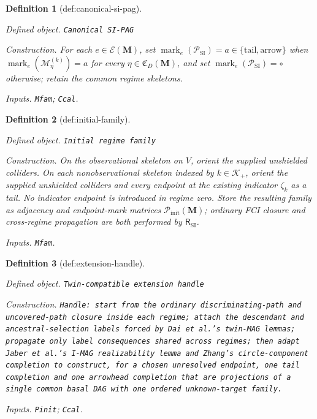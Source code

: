 \documentclass{article}
\newtheorem{definition}{Definition}
\begin{document}
\begin{definition}[def:canonical-si-pag]\label{def:canonical-si-pag}
\par\smallskip\noindent\emph{Defined object.} \texttt{Canonical SI-\allowbreak{}PAG}
\par\smallskip\noindent\emph{Construction.} For each \(e\in\mathcal E(\mathbf M)\), set \(\operatorname{mark}_e(\mathcal P_{\mathrm{SI}})=a\in\{\mathrm{tail},\mathrm{arrow}\}\) when \(\operatorname{mark}_e(\mathcal M_\eta^{(k)})=a\) for every \(\eta\in\mathfrak C_D(\mathbf M)\), and set \(\operatorname{mark}_e(\mathcal P_{\mathrm{SI}})=\circ\) otherwise; retain the common regime skeletons.
\par\smallskip\noindent\emph{Inputs.} \texttt{Mfam}; \texttt{Ccal}.
\end{definition}

\begin{definition}[def:initial-family]\label{def:initial-family}
\par\smallskip\noindent\emph{Defined object.} \texttt{Initial regime family}
\par\smallskip\noindent\emph{Construction.} On the observational skeleton on \(V\), orient the supplied unshielded colliders. On each nonobservational skeleton indexed by \(k\in\mathcal K_+\), orient the supplied unshielded colliders and every endpoint at the existing indicator \(\zeta_k\) as a tail. No indicator endpoint is introduced in regime zero. Store the resulting family as adjacency and endpoint-mark matrices \(\mathcal P_{\mathrm{init}}(\mathbf M)\); ordinary FCI closure and cross-regime propagation are both performed by \(\mathsf R_{\mathrm{SI}}\).
\par\smallskip\noindent\emph{Inputs.} \texttt{Mfam}.
\end{definition}

\begin{definition}[def:extension-handle]\label{def:extension-handle}
\par\smallskip\noindent\emph{Defined object.} \texttt{Twin-\allowbreak{}compatible extension handle}
\par\smallskip\noindent\emph{Construction.} \texttt{Handle:\allowbreak{} start from the ordinary discriminating-\allowbreak{}path and uncovered-\allowbreak{}path closure inside each regime;\allowbreak{} attach the descendant and ancestral-\allowbreak{}selection labels forced by Dai et al.'s twin-\allowbreak{}MAG lemmas;\allowbreak{} propagate only label consequences shared across regimes;\allowbreak{} then adapt Jaber et al.'s I-\allowbreak{}MAG realizability lemma and Zhang's circle-\allowbreak{}component completion to construct,\allowbreak{} for a chosen unresolved endpoint,\allowbreak{} one tail completion and one arrowhead completion that are projections of a single common basal DAG with one ordered unknown-\allowbreak{}target family.}
\par\smallskip\noindent\emph{Inputs.} \texttt{Pinit}; \texttt{Ccal}.
\end{definition}
\end{document}
